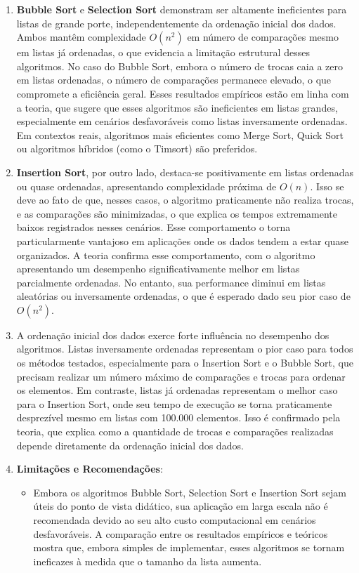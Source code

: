 \documentclass[12pt, a4paper]{report}
\begin{document}
\begin{enumerate}
    \item \textbf{Bubble Sort} e \textbf{Selection Sort} demonstram ser altamente ineficientes para listas de grande porte, independentemente da ordenação inicial dos dados. Ambos mantêm complexidade \(O(n^2)\) em número de comparações mesmo em listas já ordenadas, o que evidencia a limitação estrutural desses algoritmos. No caso do Bubble Sort, embora o número de trocas caia a zero em listas ordenadas, o número de comparações permanece elevado, o que compromete a eficiência geral. Esses resultados empíricos estão em linha com a teoria, que sugere que esses algoritmos são ineficientes em listas grandes, especialmente em cenários desfavoráveis como listas inversamente ordenadas. Em contextos reais, algoritmos mais eficientes como Merge Sort, Quick Sort ou algoritmos híbridos (como o Timsort) são preferidos.
    
    \item \textbf{Insertion Sort}, por outro lado, destaca-se positivamente em listas ordenadas ou quase ordenadas, apresentando complexidade próxima de \(O(n)\). Isso se deve ao fato de que, nesses casos, o algoritmo praticamente não realiza trocas, e as comparações são minimizadas, o que explica os tempos extremamente baixos registrados nesses cenários. Esse comportamento o torna particularmente vantajoso em aplicações onde os dados tendem a estar quase organizados. A teoria confirma esse comportamento, com o algoritmo apresentando um desempenho significativamente melhor em listas parcialmente ordenadas. No entanto, sua performance diminui em listas aleatórias ou inversamente ordenadas, o que é esperado dado seu pior caso de \(O(n^2)\).
    
    \item A ordenação inicial dos dados exerce forte influência no desempenho dos algoritmos. Listas inversamente ordenadas representam o pior caso para todos os métodos testados, especialmente para o Insertion Sort e o Bubble Sort, que precisam realizar um número máximo de comparações e trocas para ordenar os elementos. Em contraste, listas já ordenadas representam o melhor caso para o Insertion Sort, onde seu tempo de execução se torna praticamente desprezível mesmo em listas com 100.000 elementos. Isso é confirmado pela teoria, que explica como a quantidade de trocas e comparações realizadas depende diretamente da ordenação inicial dos dados.
    
    \item \textbf{Limitações e Recomendações}:
    \begin{itemize}
        \item Embora os algoritmos Bubble Sort, Selection Sort e Insertion Sort sejam úteis do ponto de vista didático, sua aplicação em larga escala não é recomendada devido ao seu alto custo computacional em cenários desfavoráveis. A comparação entre os resultados empíricos e teóricos mostra que, embora simples de implementar, esses algoritmos se tornam ineficazes à medida que o tamanho da lista aumenta.
        

\end{itemize}
\end{enumerate}
\end{document}
